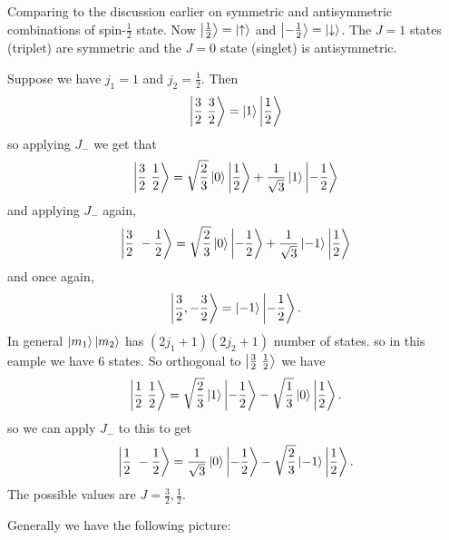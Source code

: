 \documentclass{article}
\begin{document}
Comparing to the discussion earlier on symmetric and antisymmetric combinations of spin-$ \frac 12 $ state. Now $ \ket {\frac 12} = \ket\uparrow $ and $ \ket{-\frac 12} = \ket\downarrow $. The $ J =1 $ states (triplet) are symmetric and the $ J = 0 $ state (singlet) is antisymmetric.
\begin{example}
  Suppose we have $ j_1 = 1 $ and $ j_2 = \frac 12 $. Then
  \[
	  \ket{\frac 32\ \frac 32} = \ket 1 \ket{\frac 12}
  \]
  so applying $ J_- $ we get that
  \[
	  \ket{\frac 32\ \frac 12} = \sqrt{\frac 23}\ket 0 \ket{\frac 12} + \frac 1{\sqrt 3} \ket 1 \ket{-\frac 12}
  \]
  and applying $ J_- $ again,
  \[
	  \ket{\frac 32\ -\frac 12} = \sqrt{\frac 23}\ket 0 \ket{-\frac 12} + \frac 1{\sqrt 3} \ket{-1}\ket{\frac 12}
  \]
  and once again,
  \[
	  \ket{\frac 32, -\frac 32} = \ket{-1}\ket{-\frac 12}.
  \]
  In general $ \ket{m_1}\ket{m_2} $ has $ (2j_1+1)(2j_2+1) $ number of states. so in this eample we have 6 states. So orthogonal to $ \ket{\frac 32 \ \frac 12} $ we have
  \[
	  \ket{\frac 12 \ \frac 12} = \sqrt{\frac 23} \ket 1 \ket{-\frac 12} -\sqrt{\frac 13}\ket 0 \ket{\frac 12}.
  \]
  so we can apply $ J_- $ to this to get
  \[
	  \ket{\frac 12\ - \frac 12} = \frac 1{\sqrt 3} \ket 0 \ket{-\frac 12} - \sqrt{\frac 23} \ket{-1}\ket{\frac 12}.
  \]
  The possible values are $ J = \frac 32, \frac 12 $.
\end{example}
Generally we have the following picture:
\smallskip
\FloatBarrier
\end{document}

